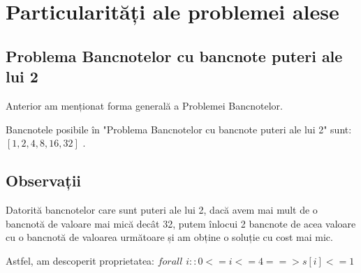 
\chapter{Particularități ale problemei alese}
    
\section{Problema Bancnotelor cu bancnote puteri ale lui 2}
Anterior am menționat forma generală a Problemei Bancnotelor.\par
Bancnotele posibile în "Problema Bancnotelor cu bancnote puteri ale lui 2" sunt: 
$[1, 2, 4, 8, 16, 32]$ . 

\section{Observații}
    Datorită bancnotelor care sunt puteri ale lui 2, dacă avem mai mult de o bancnotă de valoare mai mică decât 32,
    putem înlocui 2 bancnote de acea valoare cu o bancnotă de valoarea următoare și am obține o soluție cu cost mai mic.\par
    Astfel, am descoperit proprietatea: 
    $  forall$ $i :: 0 <= i <= 4 ==> s[i] <= 1 $

